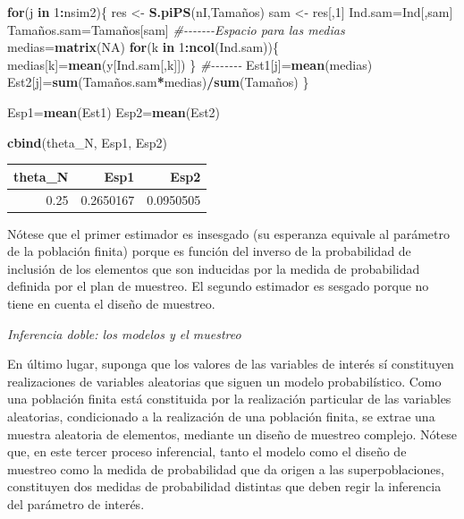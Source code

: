 \documentclass[
  spanish,
  12pt,
]{book}
\newenvironment{Shaded}{\begin{snugshade}}{\end{snugshade}}
\newcommand{\CommentTok}[1]{\textcolor[rgb]{0.56,0.35,0.01}{\textit{#1}}}
\newcommand{\ConstantTok}[1]{\textcolor[rgb]{0.56,0.35,0.01}{#1}}
\newcommand{\ControlFlowTok}[1]{\textcolor[rgb]{0.13,0.29,0.53}{\textbf{#1}}}
\newcommand{\DecValTok}[1]{\textcolor[rgb]{0.00,0.00,0.81}{#1}}
\newcommand{\FunctionTok}[1]{\textcolor[rgb]{0.13,0.29,0.53}{\textbf{#1}}}
\newcommand{\NormalTok}[1]{#1}
\newcommand{\OtherTok}[1]{\textcolor[rgb]{0.56,0.35,0.01}{#1}}
\newcommand{\SpecialCharTok}[1]{\textcolor[rgb]{0.81,0.36,0.00}{\textbf{#1}}}
\begin{document}
\begin{Shaded}
\begin{Highlighting}[]
\ControlFlowTok{for}\NormalTok{(j }\ControlFlowTok{in} \DecValTok{1}\SpecialCharTok{:}\NormalTok{nsim2)\{}
\NormalTok{res }\OtherTok{\textless{}{-}} \FunctionTok{S.piPS}\NormalTok{(nI,Tamaños)}
\NormalTok{sam }\OtherTok{\textless{}{-}}\NormalTok{ res[,}\DecValTok{1}\NormalTok{] }
\NormalTok{Ind.sam}\OtherTok{=}\NormalTok{Ind[,sam]}
\NormalTok{Tamaños.sam}\OtherTok{=}\NormalTok{Tamaños[sam]}
\CommentTok{\#{-}{-}{-}{-}{-}{-}{-}Espacio para las medias}
\NormalTok{medias}\OtherTok{=}\FunctionTok{matrix}\NormalTok{(}\ConstantTok{NA}\NormalTok{)}
\ControlFlowTok{for}\NormalTok{(k }\ControlFlowTok{in} \DecValTok{1}\SpecialCharTok{:}\FunctionTok{ncol}\NormalTok{(Ind.sam))\{}
\NormalTok{medias[k]}\OtherTok{=}\FunctionTok{mean}\NormalTok{(y[Ind.sam[,k]])}
\NormalTok{\}}
\CommentTok{\#{-}{-}{-}{-}{-}{-}{-}}
\NormalTok{Est1[j]}\OtherTok{=}\FunctionTok{mean}\NormalTok{(medias)}
\NormalTok{Est2[j]}\OtherTok{=}\FunctionTok{sum}\NormalTok{(Tamaños.sam}\SpecialCharTok{*}\NormalTok{medias)}\SpecialCharTok{/}\FunctionTok{sum}\NormalTok{(Tamaños)}
\NormalTok{\}}

\NormalTok{Esp1}\OtherTok{=}\FunctionTok{mean}\NormalTok{(Est1)}
\NormalTok{Esp2}\OtherTok{=}\FunctionTok{mean}\NormalTok{(Est2)}

\FunctionTok{cbind}\NormalTok{(theta\_N, Esp1, Esp2)}
\end{Highlighting}
\end{Shaded}

\begin{tabular}{r|r|r}
\hline
theta\_N & Esp1 & Esp2\\
\hline
0.25 & 0.2650167 & 0.0950505\\
\hline
\end{tabular}

Nótese que el primer estimador es insesgado (su esperanza equivale al parámetro de la población finita) porque es función del inverso de la probabilidad de inclusión de los elementos que son inducidas por la medida de probabilidad definida por el plan de muestreo. El segundo estimador es sesgado porque no tiene en cuenta el diseño de muestreo.

\emph{Inferencia doble: los modelos y el muestreo}

En último lugar, suponga que los valores de las variables de interés sí constituyen realizaciones de variables aleatorias que siguen un modelo probabilístico. Como una población finita está constituida por la realización particular de las variables aleatorias, condicionado a la realización de una población finita, se extrae una muestra aleatoria de elementos, mediante un diseño de muestreo complejo. Nótese que, en este tercer proceso inferencial, tanto el modelo como el diseño de muestreo como la medida de probabilidad que da origen a las superpoblaciones, constituyen dos medidas de probabilidad distintas que deben regir la inferencia del parámetro de interés.
\end{document}
